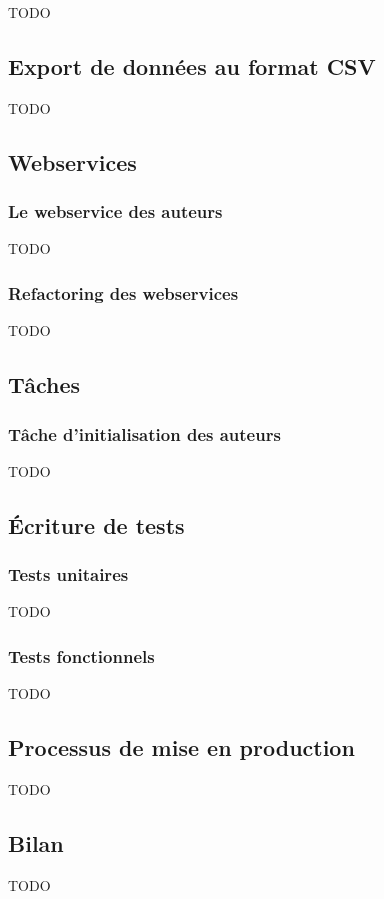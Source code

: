 TODO





\subsection{Export de données au format CSV}

TODO

\subsection{Webservices}

\subsubsection{Le webservice des auteurs}

TODO

\subsubsection{Refactoring des webservices}

TODO

\subsection{Tâches}

\subsubsection{Tâche d'initialisation des auteurs}

TODO

\subsection{Écriture de tests}

\subsubsection{Tests unitaires}

TODO

\subsubsection{Tests fonctionnels}

TODO

\subsection{Processus de mise en production}

TODO

\subsection{Bilan}

TODO
